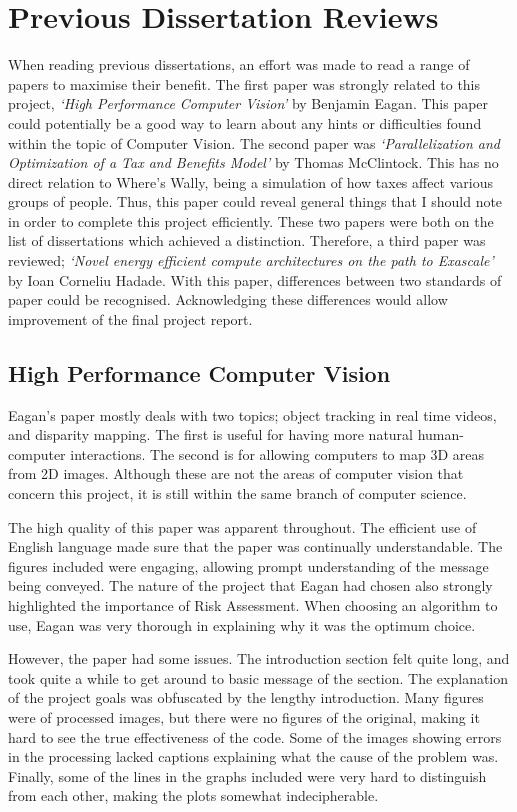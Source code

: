 \documentclass[../main.tex]{subfiles}
\begin{document}
  \section{Previous Dissertation Reviews}
    When reading previous dissertations, an effort was made to read a range of papers to maximise their benefit.
    The first paper was strongly related to this project, \emph{`High Performance Computer Vision'} by Benjamin Eagan\cite{prevdis:hpcv}.
    This paper could potentially be a good way to learn about any hints or difficulties found within the topic of Computer Vision.
    The second paper was \emph{`Parallelization and Optimization of a Tax and Benefits Model'} by Thomas McClintock\cite{prevdis:tax}. 
    This has no direct relation to Where's Wally, being a simulation of how taxes affect various groups of people.
    Thus, this paper could reveal general things that I should note in order to complete this project efficiently.
    These two papers were both on the list of dissertations which achieved a distinction.
    Therefore, a third paper was reviewed; \emph{`Novel energy efficient compute architectures on the path to Exascale'} by Ioan Corneliu Hadade\cite{prevdis:exascale}.
    With this paper, differences between two standards of paper could be recognised.
    Acknowledging these differences would allow improvement of the final project report.
  \subsection{High Performance Computer Vision}
    Eagan's paper mostly deals with two topics; object tracking in real time videos, and disparity mapping.
    The first is useful for having more natural human-computer interactions.
    The second is for allowing computers to map 3D areas from 2D images.
    Although these are not the areas of computer vision that concern this project, it is still within the same branch of computer science.
    
    The high quality of this paper was apparent throughout.
    The efficient use of English language made sure that the paper was continually understandable.
    The figures included were engaging, allowing prompt understanding of the message being conveyed.
    The nature of the project that Eagan had chosen also strongly highlighted the importance of Risk Assessment.
    When choosing an algorithm to use, Eagan was very thorough in explaining why it was the optimum choice.

    However, the paper had some issues.
    The introduction section felt quite long, and took quite a while to get around to basic message of the section.
    The explanation of the project goals was obfuscated by the lengthy introduction.
    Many figures were of processed images, but there were no figures of the original, making it hard to see the true effectiveness of the code.
    Some of the images showing errors in the processing lacked captions explaining what the cause of the problem was.
    Finally, some of the lines in the graphs included were very hard to distinguish from each other, making the plots somewhat indecipherable.  
\end{document}
